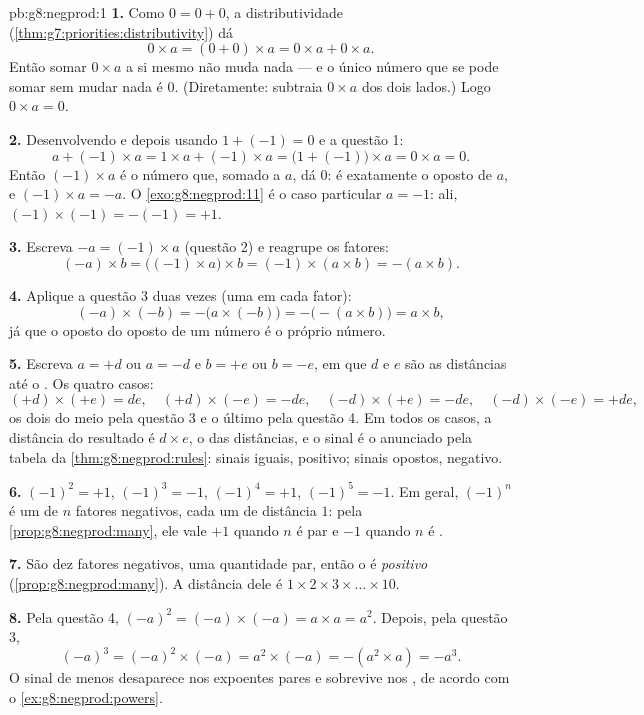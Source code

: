 \begin{solution}{pb:g8:negprod:1}
\textbf{1.} Como $0 = 0 + 0$, a distributividade
(\cref{thm:g7:priorities:distributivity}) dá
\[
0 \times a = (0 + 0) \times a = 0 \times a + 0 \times a .
\]
Então somar $0 \times a$ a si mesmo não muda nada --- e o único número
que se pode somar sem mudar nada é $0$. (Diretamente: subtraia
$0 \times a$ dos dois lados.) Logo $0 \times a = 0$.

\textbf{2.} Desenvolvendo e depois usando $1 + (-1) = 0$ e a questão
1:
\[
a + (-1) \times a
= 1 \times a + (-1) \times a
= \bigl(1 + (-1)\bigr) \times a
= 0 \times a = 0 .
\]
Então $(-1) \times a$ é o número que, somado a $a$, dá $0$: é
exatamente o oposto de $a$, e $(-1) \times a = -a$. O
\cref{exo:g8:negprod:11} é o caso particular $a = -1$: ali,
$(-1) \times (-1) = -(-1) = +1$.

\textbf{3.} Escreva $-a = (-1) \times a$ (questão 2) e reagrupe os
fatores:
\[
(-a) \times b
= \bigl((-1) \times a\bigr) \times b
= (-1) \times (a \times b)
= -(a \times b) .
\]

\textbf{4.} Aplique a questão 3 duas vezes (uma em cada fator):
\[
(-a) \times (-b)
= -\bigl(a \times (-b)\bigr)
= -\bigl(-(a \times b)\bigr)
= a \times b ,
\]
já que o oposto do oposto de um número é o próprio número.

\textbf{5.} Escreva $a = +d$ ou $a = -d$ e $b = +e$ ou $b = -e$, em que
$d$ e $e$ são as distâncias até o . Os quatro casos:
\[
(+d) \times (+e) = de, \quad
(+d) \times (-e) = -de, \quad
(-d) \times (+e) = -de, \quad
(-d) \times (-e) = +de,
\]
os dois do meio pela questão 3 e o último pela questão 4. Em todos os
casos, a distância do resultado é $d \times e$, o  das
distâncias, e o sinal é o anunciado pela tabela da
\cref{thm:g8:negprod:rules}: sinais iguais, positivo; sinais opostos,
negativo.

\textbf{6.} $(-1)^2 = +1$, $(-1)^3 = -1$, $(-1)^4 = +1$,
$(-1)^5 = -1$. Em geral, $(-1)^n$ é um  de $n$ fatores
negativos, cada um de distância $1$: pela
\cref{prop:g8:negprod:many}, ele vale $+1$ quando $n$ é par e $-1$
quando $n$ é .

\textbf{7.} São dez fatores negativos, uma quantidade par, então o
 é \emph{positivo}
(\cref{prop:g8:negprod:many}). A distância dele é
$1 \times 2 \times 3 \times \dots \times 10$.

\textbf{8.} Pela questão 4,
$(-a)^2 = (-a) \times (-a) = a \times a = a^2$. Depois, pela questão
3,
\[
(-a)^3 = (-a)^2 \times (-a) = a^2 \times (-a) = -(a^2 \times a)
= -a^3 .
\]
O sinal de menos desaparece nos expoentes pares e sobrevive nos
, de acordo com o \cref{ex:g8:negprod:powers}.


\end{solution}
